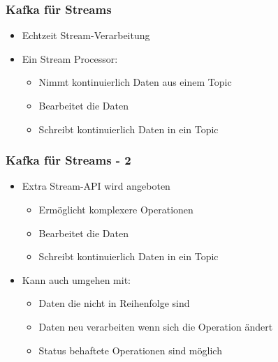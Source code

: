 \begin{frame}
\frametitle{Kafka für Streams}

\begin{itemize}
	\item Echtzeit Stream-Verarbeitung
	\item Ein Stream Processor:
	\begin{itemize}
		\item Nimmt kontinuierlich Daten aus einem Topic   %
		\item Bearbeitet die Daten %
		\item Schreibt kontinuierlich Daten in ein Topic %
	\end{itemize}
\end{itemize}

\end{frame}


\begin{frame}
\frametitle{Kafka für Streams - 2}

\begin{itemize}
	\item Extra Stream-API wird angeboten
	\begin{itemize}
		\item Ermöglicht komplexere Operationen  %
		\item Bearbeitet die Daten %
		\item Schreibt kontinuierlich Daten in ein Topic %
	\end{itemize}
	\item Kann auch umgehen mit:
	\begin{itemize}
		\item Daten die nicht in Reihenfolge sind  %
		\item Daten neu verarbeiten wenn sich die Operation ändert %
		\item Status behaftete Operationen sind möglich %
	\end{itemize}
\end{itemize}


\end{frame}

